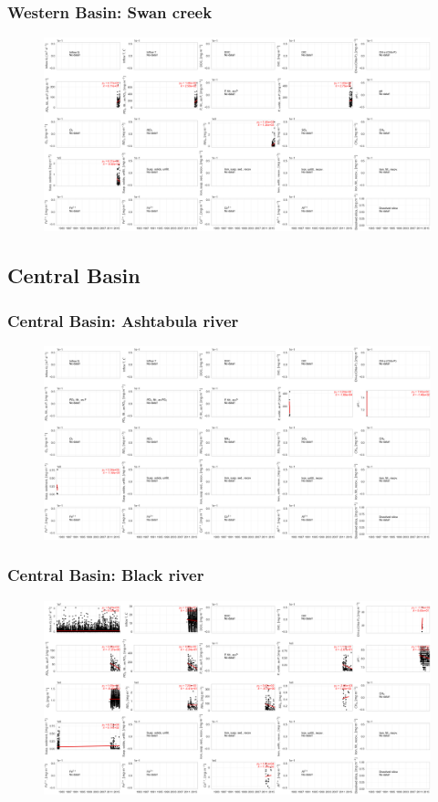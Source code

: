 \documentclass{beamer}
\begin{document}
\begin{frame}
\frametitle{Western Basin: Swan creek}
\begin{figure}
\includegraphics[width=\textwidth]{rivers/Western basin/plot_all swancreek.png}
\end{figure}
\end{frame}



\subsection{Central Basin}
\label{sub:central_basin}


\begin{frame}
\frametitle{Central Basin: Ashtabula river}
\begin{figure}
\includegraphics[width=\textwidth]{rivers/Central basin/plot_all ashtabulariver.png}
\end{figure}
\end{frame}

\begin{frame}
\frametitle{Central Basin: Black river}
\begin{figure}
\includegraphics[width=\textwidth]{rivers/Central basin/plot_all blackriver.png}
\end{figure}
\end{frame}
\end{document}

